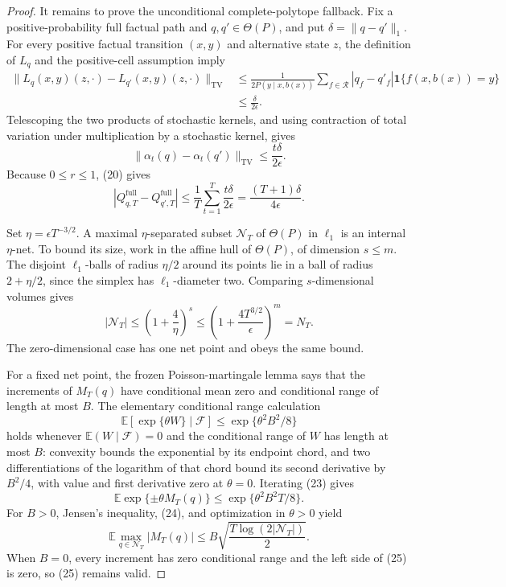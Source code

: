 \documentclass{article}
\begin{document}
\begin{proof}
It remains to prove the unconditional complete-polytope fallback.  Fix a positive-probability full factual path and \(q,q'\in\Theta(P)\), and put \(\delta=\lVert q-q'\rVert_1\).  For every positive factual transition \((x,y)\) and alternative state \(z\), the definition of \(L_q\) and the positive-cell assumption imply
\[
 \begin{aligned}
 \bigl\|L_q(x,y)(z,\cdot)-L_{q'}(x,y)(z,\cdot)\bigr\|_{\mathrm{TV}}
 &\leq\frac1{2P(y\mid x,b(x))}
 \sum_{f\in\mathcal R}|q_f-q'_f|\mathbf 1\{f(x,b(x))=y\}\\
 &\leq\frac{\delta}{2\epsilon}.
 \end{aligned}
 \tag{19}
\]
Telescoping the two products of stochastic kernels, and using contraction of total variation under multiplication by a stochastic kernel, gives
\[
 \lVert\alpha_t(q)-\alpha_t(q')\rVert_{\mathrm{TV}}
 \leq\frac{t\delta}{2\epsilon}.
 \tag{20}
\]
Because \(0\leq r\leq1\), (20) gives
\[
 \left|Q^{\mathrm{full}}_{q,T}-Q^{\mathrm{full}}_{q',T}\right|
 \leq\frac1T\sum_{t=1}^T\frac{t\delta}{2\epsilon}
 =\frac{(T+1)\delta}{4\epsilon}.
 \tag{21}
\]

Set \(\eta=\epsilon T^{-3/2}\).  A maximal \(\eta\)-separated subset \(\mathcal N_T\) of \(\Theta(P)\) in \(\ell_1\) is an internal \(\eta\)-net.  To bound its size, work in the affine hull of \(\Theta(P)\), of dimension \(s\leq m\).  The disjoint \(\ell_1\)-balls of radius \(\eta/2\) around its points lie in a ball of radius \(2+\eta/2\), since the simplex has \(\ell_1\)-diameter two.  Comparing \(s\)-dimensional volumes gives
\[
 |\mathcal N_T|\leq\left(1+\frac4\eta\right)^s
 \leq\left(1+\frac{4T^{3/2}}\epsilon\right)^m=N_T.
 \tag{22}
\]
The zero-dimensional case has one net point and obeys the same bound.

For a fixed net point, the frozen Poisson-martingale lemma says that the increments of \(M_T(q)\) have conditional mean zero and conditional range of length at most \(B\).  The elementary conditional range calculation
\[
 \mathbb E[\exp\{\theta W\}\mid\mathcal F]
 \leq\exp\{\theta^2B^2/8\}
 \tag{23}
\]
holds whenever \(\mathbb E(W\mid\mathcal F)=0\) and the conditional range of \(W\) has length at most \(B\): convexity bounds the exponential by its endpoint chord, and two differentiations of the logarithm of that chord bound its second derivative by \(B^2/4\), with value and first derivative zero at \(\theta=0\).  Iterating (23) gives
\[
 \mathbb E\exp\{\pm\theta M_T(q)\}
 \leq\exp\{\theta^2B^2T/8\}.
 \tag{24}
\]
For \(B>0\), Jensen's inequality, (24), and optimization in \(\theta>0\) yield
\[
 \mathbb E\max_{q\in\mathcal N_T}|M_T(q)|
 \leq B\sqrt{\frac{T\log(2|\mathcal N_T|)}2}.
 \tag{25}
\]
When \(B=0\), every increment has zero conditional range and the left side of (25) is zero, so (25) remains valid.


\end{proof}
\end{document}
